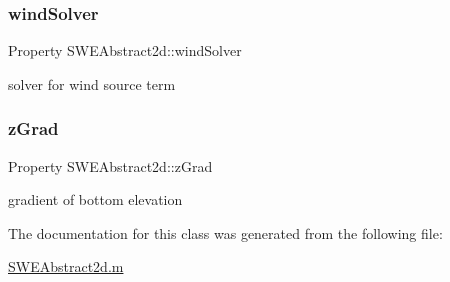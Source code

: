 \subsubsection{\texorpdfstring{wind\+Solver}{windSolver}}
{\footnotesize\ttfamily Property S\+W\+E\+Abstract2d\+::wind\+Solver\hspace{0.3cm}{\ttfamily [private]}}



solver for wind source term 

\mbox{\label{class_s_w_e_abstract2d_a9646420b4380fecc669f1a1d2d2904b8}} 
\subsubsection{\texorpdfstring{z\+Grad}{zGrad}}
{\footnotesize\ttfamily Property S\+W\+E\+Abstract2d\+::z\+Grad\hspace{0.3cm}{\ttfamily [protected]}}



gradient of bottom elevation 



The documentation for this class was generated from the following file\+:\begin{DoxyCompactItemize}
\item 
\hyperlink{_s_w_e_abstract2d_8m}{S\+W\+E\+Abstract2d.\+m}\end{DoxyCompactItemize}
